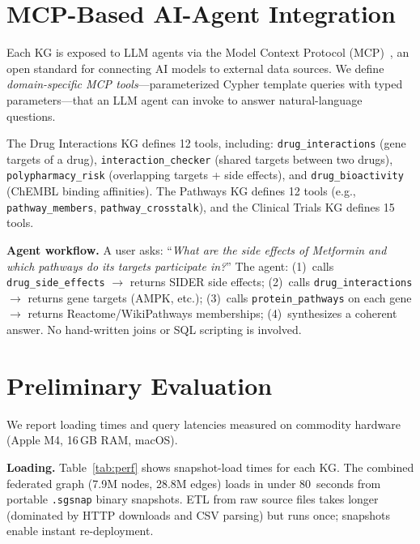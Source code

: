 \documentclass[sigconf, anonymous, review]{acmart}
\begin{document}
\section{MCP-Based AI-Agent Integration}\label{sec:mcp}

Each KG is exposed to LLM agents via the Model Context
Protocol (MCP)~\cite{anthropic2024mcp}, an open standard for
connecting AI models to external data sources.  We define
\emph{domain-specific MCP tools}---parameterized Cypher template
queries with typed parameters---that an LLM agent can invoke
to answer natural-language questions.

The Drug Interactions KG defines 12 tools, including:
\texttt{drug\_interactions} (gene targets of a drug),
\texttt{interaction\_checker} (shared targets between two drugs),
\texttt{polypharmacy\_risk} (overlapping targets + side effects),
and \texttt{drug\_bioactivity} (ChEMBL binding affinities).
The Pathways KG defines 12 tools (e.g., \texttt{pathway\_members},
\texttt{pathway\_crosstalk}), and the Clinical Trials KG defines
15 tools.

\smallskip\noindent\textbf{Agent workflow.}  A user asks: ``\emph{What are
the side effects of Metformin and which pathways do its targets
participate in?}''  The agent: (1)~calls \texttt{drug\_side\_effects}
$\to$ returns SIDER side effects; (2)~calls
\texttt{drug\_interactions} $\to$ returns gene targets (AMPK, etc.);
(3)~calls \texttt{protein\_pathways} on each gene $\to$ returns
Reactome/WikiPathways memberships; (4)~synthesizes a coherent answer.
No hand-written joins or SQL scripting is involved.

\section{Preliminary Evaluation}\label{sec:eval}

We report loading times and query latencies measured on
commodity hardware (Apple M4, 16\,GB RAM, macOS).

\smallskip\noindent\textbf{Loading.}
Table~\ref{tab:perf} shows snapshot-load times for each KG.
The combined federated graph (7.9M nodes, 28.8M edges)
loads in under 80~seconds from portable \texttt{.sgsnap}
binary snapshots.  ETL from raw source files takes
longer (dominated by HTTP downloads and CSV parsing)
but runs once; snapshots enable instant re-deployment.
\end{document}
